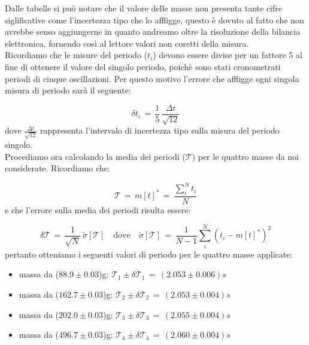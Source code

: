 Dalle tabelle si può notare che il valore delle masse non presenta tante cifre siglificative come l'incertezza tipo che lo affligge, questo è dovuto al fatto che non avrebbe senso aggiungerne in quanto andreamo oltre la risoluzione della bilancia elettronica, fornendo così al lettore valori non coretti della misura.\\

Ricordiamo che le misure del periodo ($t_i$) devono essere divise per un fattore 5 al fine di ottenere il valore del singolo periodo, poichè sono stati  cronometrati periodi di cinque oscillazioni. Per questo motivo l'errore che affligge ogni singola misura di periodo sarà il seguente:

\begin{equation*}
	\delta t_i \,=\, \frac{1}{5} \, \frac{\Delta t}{\sqrt{12}}
\end{equation*}
%
dove $\frac{\Delta t}{\sqrt{12}}$ rappresenta l'intervalo di incertezza tipo sulla misura del periodo singolo.\\
Procediamo ora calcolando la media dei periodi ($\mathcal{T}$) per le quattro masse da noi considerate. Ricordiamo che:

\begin{equation*}
	\mathcal{T} \,=\, m[t]^* \,=\, \frac{\sum_{i}^{N} t_i}{N}
\end{equation*}
%
e che l'errore sulla media dei periodi risulta essere:

\begin{equation*}
	\delta \mathcal{T} \,=\, \frac{1}{\sqrt{N}} \, \tilde\sigma[\mathcal{T}] \quad \text{dove} \quad \tilde\sigma[\mathcal{T}] \,=\, \frac{1}{N-1} \sum_{i}^{N} (t_i - m[t]^*)^2
\end{equation*}
%
pertanto otteniamo i seguenti valori di periodo per le quattro masse applicate:
\begin{itemize}
	\item{ massa da ($88.9 \pm 0.03$)g: $\mathcal{T}_1 \pm \delta\mathcal{T}_1 \,=\, (2.053 \pm 0.006) s $}
	\item{ massa da ($162.7 \pm 0.03$)g: $\mathcal{T}_2 \pm \delta\mathcal{T}_2 \,=\, (2.053 \pm 0.004) s $}
	\item{ massa da ($202.0 \pm 0.03$)g: $\mathcal{T}_3 \pm \delta\mathcal{T}_3 \,=\, (2.055 \pm 0.004) s $}
	\item{ massa da ($496.7 \pm 0.03$)g: $\mathcal{T}_4 \pm \delta\mathcal{T}_4 \,=\, (2.060 \pm 0.004) s $}
\end{itemize}


